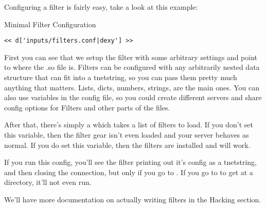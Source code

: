Configuring a filter is fairly easy, take a look at this example:

\begin{code}{Minimal Filter Configuration}
\begin{lstlisting}
<< d['inputs/filters.conf|dexy'] >>
\end{lstlisting}
\end{code}

First you can see that we setup the  filter with some arbitrary
settings and point to where the .so file is.  Filters can be configured 
with any arbitrarily nested data structure that can fit into a tnetstring,
so you can pass them pretty much anything that matters.  Lists, dicts, numbers,
strings, are the main ones.  You can also use variables in the config file,
so you could create different servers and share config options for Filters
and other parts of the files.

After that, there's simply a  which takes a list of
filters to load.  If you don't set this variable, then the filter gear isn't
even loaded and your server behaves as normal.  If you do set this variable,
then the filters are installed and will work.

If you run this config, you'll see the filter printing out it's config
as a tnetstring, and then closing the connection, but only if you go
to .  If you go to  to
get at a directory, it'll not even run.

We'll have more documentation on actually writing filters in the 
Hacking section.

